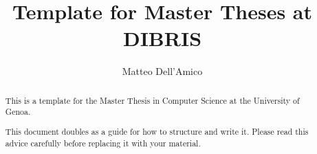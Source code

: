 \documentclass{masterthesis}
\begin{document}
\title{Template for Master Theses at DIBRIS}

\author{Matteo Dell'Amico}



\maketitle

\begin{abstract}
This is a template for the Master Thesis in Computer Science at the University of Genoa.

This document doubles as a guide for how to structure and write it. Please read this advice carefully before replacing it with your material.
\end{abstract}

\tableofcontents













\printbibliography
% 
% 
\end{document}
